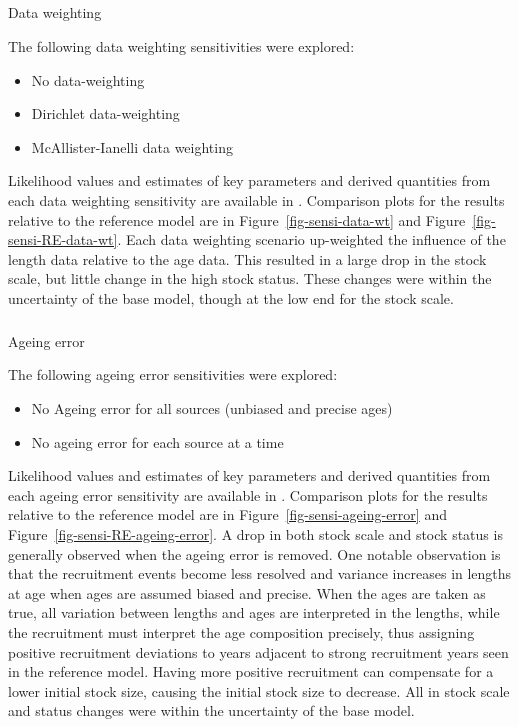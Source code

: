 \documentclass[
]{scrartcl}
\makeatletter
\let\oldsubparagraph\subparagraph
\renewcommand{\subparagraph}{
    \@ifstar
      \xxxSubParagraphStar
      \xxxSubParagraphNoStar
  }
\newcommand{\xxxSubParagraphStar}[1]{\oldsubparagraph*{#1}\mbox{}}
\newcommand{\xxxSubParagraphNoStar}[1]{\oldsubparagraph{#1}\mbox{}}
\providecommand{\tightlist}{%
  \setlength{\itemsep}{0pt}\setlength{\parskip}{0pt}}\usepackage{longtable,booktabs,array}
\makeatother
\begin{document}
\subparagraph{Data weighting}\label{data-weighting-1}

The following data weighting sensitivities were explored:

\begin{itemize}
\tightlist
\item
  No data-weighting
\item
  Dirichlet data-weighting
\item
  McAllister-Ianelli data weighting
\end{itemize}

Likelihood values and estimates of key parameters and derived quantities
from each data weighting sensitivity are available in . Comparison plots
for the results relative to the reference model are in
Figure~\ref{fig-sensi-data-wt} and Figure~\ref{fig-sensi-RE-data-wt}.
Each data weighting scenario up-weighted the influence of the length
data relative to the age data. This resulted in a large drop in the
stock scale, but little change in the high stock status. These changes
were within the uncertainty of the base model, though at the low end for
the stock scale.

\subparagraph{Ageing error}\label{ageing-error}

The following ageing error sensitivities were explored:

\begin{itemize}
\tightlist
\item
  No Ageing error for all sources (unbiased and precise ages)
\item
  No ageing error for each source at a time
\end{itemize}

Likelihood values and estimates of key parameters and derived quantities
from each ageing error sensitivity are available in . Comparison plots
for the results relative to the reference model are in
Figure~\ref{fig-sensi-ageing-error} and
Figure~\ref{fig-sensi-RE-ageing-error}. A drop in both stock scale and
stock status is generally observed when the ageing error is removed. One
notable observation is that the recruitment events become less resolved
and variance increases in lengths at age when ages are assumed biased
and precise. When the ages are taken as true, all variation between
lengths and ages are interpreted in the lengths, while the recruitment
must interpret the age composition precisely, thus assigning positive
recruitment deviations to years adjacent to strong recruitment years
seen in the reference model. Having more positive recruitment can
compensate for a lower initial stock size, causing the initial stock
size to decrease. All in stock scale and status changes were within the
uncertainty of the base model.
\end{document}
